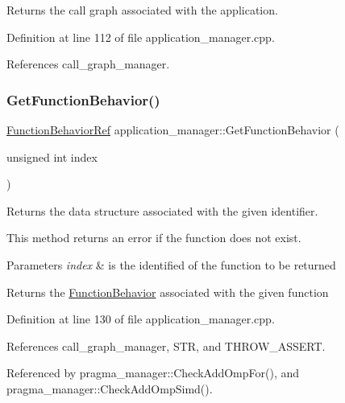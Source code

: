 Returns the call graph associated with the application. 



Definition at line 112 of file application\+\_\+manager.\+cpp.



References call\+\_\+graph\+\_\+manager.

\mbox{\label{classapplication__manager_ad6feddfe15eda18f0b886c465bc5add4}} 
\subsubsection{\texorpdfstring{Get\+Function\+Behavior()}{GetFunctionBehavior()}}
{\footnotesize\ttfamily \hyperlink{function__behavior_8hpp_affbc6a46ab86ddfabe31c10986d333dc}{Function\+Behavior\+Ref} application\+\_\+manager\+::\+Get\+Function\+Behavior (\begin{DoxyParamCaption}\item[{unsigned int}]{index }\end{DoxyParamCaption})}



Returns the data structure associated with the given identifier. 

This method returns an error if the function does not exist. 
\begin{DoxyParams}{Parameters}
{\em index} & is the identified of the function to be returned \\
\hline
\end{DoxyParams}
\begin{DoxyReturn}{Returns}
the \hyperlink{classFunctionBehavior}{Function\+Behavior} associated with the given function 
\end{DoxyReturn}


Definition at line 130 of file application\+\_\+manager.\+cpp.



References call\+\_\+graph\+\_\+manager, S\+TR, and T\+H\+R\+O\+W\+\_\+\+A\+S\+S\+E\+RT.



Referenced by pragma\+\_\+manager\+::\+Check\+Add\+Omp\+For(), and pragma\+\_\+manager\+::\+Check\+Add\+Omp\+Simd().

